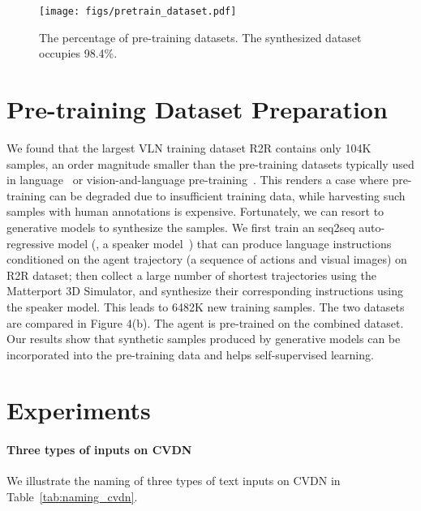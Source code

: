 \documentclass[10pt,twocolumn,letterpaper]{article}
\begin{document}
\begin{wrapfigure}{R}{8.8cm}
\vspace{-4mm}
\centering
{
\texttt{[image: figs/pretrain\_dataset.pdf]}
}
\caption{The percentage of pre-training datasets. The synthesized dataset occupies 98.4\%.}
\label{exp:nm}
\vspace{-5mm}
\end{wrapfigure}
\section{Pre-training Dataset Preparation}
We found that the largest VLN training dataset R2R contains only 104K samples, an order magnitude smaller than the pre-training datasets typically used in language~\cite{devlin2018bert} or vision-and-language pre-training~\cite{zhou2019unified}. This renders a case where pre-training can be degraded due to insufficient training data, while harvesting such samples with human annotations is expensive. Fortunately, we can resort to generative models to synthesize the samples. We first train an seq2seq auto-regressive model (\ie, a speaker model~\cite{fried2018speaker}) that can produce language instructions conditioned on the agent trajectory (a sequence of actions and visual images) on R2R dataset; then collect a large number of shortest trajectories using the Matterport 3D Simulator, and synthesize their corresponding instructions using the speaker model. This leads to 6482K new training samples. The two datasets are compared in Figure 4(b). The agent is pre-trained on the combined dataset. Our results show that synthetic samples produced by generative models can be incorporated into the pre-training data and helps self-supervised learning.


\section{Experiments}

\paragraph{Three types of inputs on CVDN} We illustrate the  naming of three types of text inputs on CVDN in Table~\ref{tab:naming_cvdn}.
\end{document}
